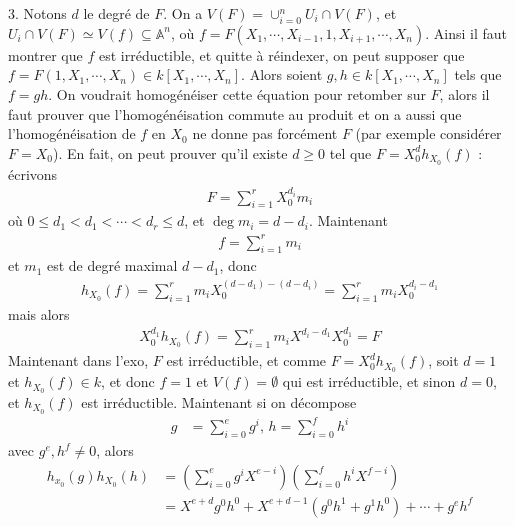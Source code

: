         \begin{question}{3.}
            Notons $d$ le degré de $F$. On a $V(F) = \cup_{i = 0}^n U_i \cap V(F)$, et $U_i \cap V(F) \simeq V(f) \subseteq \mathbb{A}^n$, où $f = F(X_1, \cdots, X_{i-1}, 1, X_{i+1}, \cdots, X_n)$. Ainsi il faut montrer que $f$ est irréductible, et quitte à réindexer, on peut supposer que $f = F(1, X_1, \cdots, X_n) \in k[X_1, \cdots, X_n]$. Alors soient $g,h \in k[X_1, \cdots, X_n]$ tels que $f = gh$. On voudrait homogénéiser cette équation pour retomber sur $F$, alors il faut prouver que l'homogénéisation commute au produit et on a aussi que l'homogénéisation de $f$ en $X_0$ ne donne pas forcément $F$ (par exemple considérer $F = X_0$). En fait, on peut prouver qu'il existe $d \geq 0$ tel que $F = X_0^dh_{X_0}(f)$ : écrivons
            \begin{align*}
                F = \sum_{i = 1}^r X_0^{d_i}m_i
            \end{align*}
            où $0 \leq d_1 < d_1 < \cdots < d_r \leq d$, et $\deg m_i = d - d_i$. Maintenant
            \begin{align*}
                f = \sum_{i = 1}^r m_i
            \end{align*}
            et $m_1$ est de degré maximal $d - d_1$, donc 
            \begin{align*}
                h_{X_0}(f) = \sum_{i = 1}^r m_iX_0^{(d - d_1) - (d - d_i)} = \sum_{i = 1}^r m_iX_0^{d_i - d_1}
            \end{align*}
            mais alors
            \begin{align*}
                X_0^{d_1}h_{X_0}(f) = \sum_{i = 1}^r m_iX^{d_i - d_1}X_0^{d_1} = F
            \end{align*}
            Maintenant dans l'exo, $F$ est irréductible, et comme $F = X_0^d h_{X_0}(f)$, soit $d = 1$ et $h_{X_0}(f) \in k$, et donc $f = 1$ et $V(f) = \emptyset$ qui est irréductible, et sinon $d = 0$, et $h_{X_0}(f)$ est irréductible. Maintenant si on décompose
            \begin{align*}
                g &= \sum_{i = 0}^e g^i,\, h = \sum_{i = 0}^f h^i
            \end{align*}
            avec $g^e, h^f \neq 0$, alors 
            \begin{align*}
                h_{x_0}(g)h_{X_0}(h) &= \left(\sum_{i = 0}^e g^iX^{e - i}\right) \left(\sum_{i = 0}^f h^iX^{f - i}\right) \\
                &= X^{e + d}g^0h^0 + X^{e + d - 1}(g^0h^1 + g^1h^0) + \cdots + g^eh^f \\

\end{align*}
\end{question}
